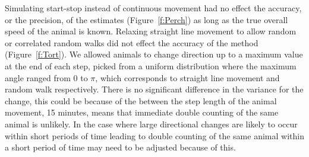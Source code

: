 \documentclass[a4paper,10pt,reqno,oneside]{amsart}
\begin{document}
 Simulating start-stop instead of continuous movement had no effect the accuracy, or the precision, of the estimates (Figure~\ref{f:Perch}) as long as the true overall speed of the animal is known. Relaxing straight line movement to allow random or correlated random walks did not effect the accuracy of the method (Figure~\ref{f:Tort}). We allowed animals to change direction up to a maximum value at the end of each step, picked from a uniform distribution where the maximum angle ranged from 0 to $\pi$, which corresponds to straight line movement and random walk respectively. There is no significant difference in the variance for the change, this could be because of the between the step length of the animal movement, 15 minutes, means that immediate double counting of the same animal is unlikely.  In the case where large directional changes are likely to occur within short periods of time leading to double counting of the same animal within a short period of time may need to be adjusted because of this. 
\end{document}
